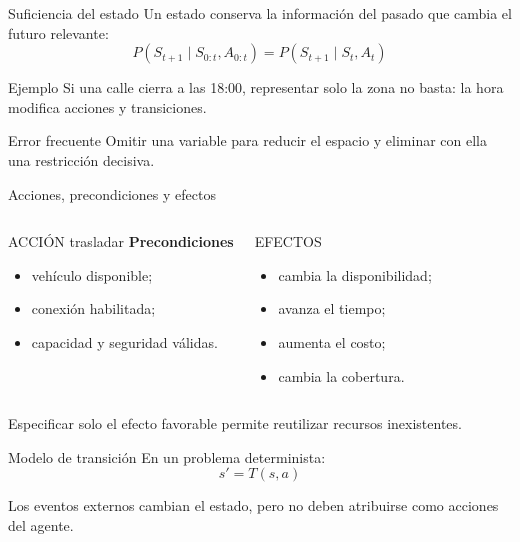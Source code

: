 \documentclass[aspectratio=169,11pt]{beamer}
\begin{document}
\begin{frame}{Suficiencia del estado}
  Un estado conserva la información del pasado que cambia el futuro relevante:
  \[
    P(S_{t+1}\mid S_{0:t},A_{0:t})=P(S_{t+1}\mid S_t,A_t)
  \]
  \begin{block}{Ejemplo}
    Si una calle cierra a las 18:00, representar solo la zona no basta: la hora modifica acciones y transiciones.
  \end{block}
  \begin{alertblock}{Error frecuente}
    Omitir una variable para reducir el espacio y eliminar con ella una restricción decisiva.
  \end{alertblock}
\end{frame}

\begin{frame}{Acciones, precondiciones y efectos}
  \small
  \begin{columns}[T]
      \begin{block}{ACCIÓN trasladar}
        \textbf{Precondiciones}
        \begin{itemize}
          \item vehículo disponible;
          \item conexión habilitada;
          \item capacidad y seguridad válidas.
        \end{itemize}
      \end{block}
      \begin{block}{EFECTOS}
        \begin{itemize}
          \item cambia la disponibilidad;
          \item avanza el tiempo;
          \item aumenta el costo;
          \item cambia la cobertura.
        \end{itemize}
      \end{block}
  \end{columns}
  \alert{Especificar solo el efecto favorable permite reutilizar recursos inexistentes.}
\end{frame}

\begin{frame}{Modelo de transición}
  En un problema determinista:
  \[s'=T(s,a)\]
  \centering
  \vfill
  Los eventos externos cambian el estado, pero no deben atribuirse como acciones del agente.
\end{frame}
\end{document}
